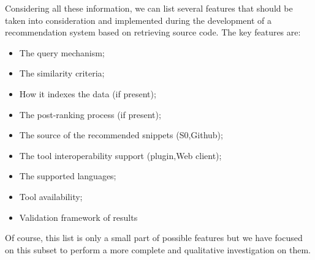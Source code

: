 Considering all these information, we can list several features that should be taken into consideration and implemented during the development of a recommendation system based on retrieving source code. The key features are: 
\begin{itemize}
\item The query mechanism;
\item  The similarity criteria;
\item  How it indexes the data (if present);
\item The post-ranking process (if present);
\item The source of the recommended snippets (S0,Github);
\item The tool interoperability support  (plugin,Web client);
\item The supported languages;
\item Tool availability;
\item Validation framework of results

\end{itemize}
Of course, this list is only a small part of possible features but we have focused on this subset to perform a more complete and qualitative investigation on them. 